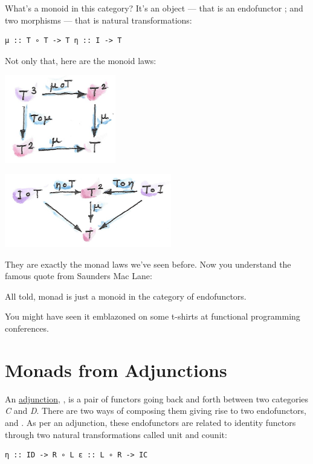 What's a monoid in this category? It's an object --- that is an
endofunctor ; and two morphisms --- that is natural
transformations:

\begin{verbatim}
μ :: T ∘ T -> T η :: I -> T
\end{verbatim}

Not only that, here are the monoid laws:

\includegraphics[width=1.90625in]{images/assoc.png}

\includegraphics[width=2.86458in]{images/unitlawcomp.png}

They are exactly the monad laws we've seen before. Now you understand
the famous quote from Saunders Mac Lane:

All told, monad is just a monoid in the category of endofunctors.

You might have seen it emblazoned on some t-shirts at functional
programming conferences.

\section{Monads from Adjunctions}\label{monads-from-adjunctions}

An
\href{https://bartoszmilewski.com/2016/04/18/adjunctions/}{adjunction},
, is a pair of functors going back and forth between two
categories \emph{C} and \emph{D}. There are two ways of composing them
giving rise to two endofunctors,  and .
As per an adjunction, these endofunctors are related to identity
functors through two natural transformations called unit and counit:

\begin{verbatim}
η :: ID -> R ∘ L ε :: L ∘ R -> IC
\end{verbatim}

